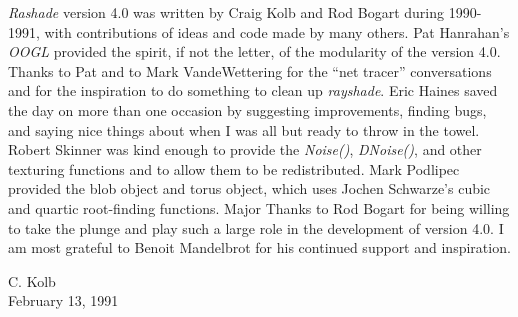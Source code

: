 {\em Rashade} version 4.0
was written by Craig Kolb and Rod Bogart during 1990-1991, with contributions
of ideas and code made by many others.
Pat Hanrahan's {\em OOGL} provided the spirit, if not the letter, of the
modularity of the version 4.0.  Thanks to Pat and to Mark VandeWettering
for the ``net tracer'' conversations and for the inspiration to do something
to clean up {\em rayshade}.
Eric Haines saved the day on more than one occasion by suggesting
improvements, finding bugs, and saying nice things about \rayshade
when I was all but ready to throw in the towel.
Robert Skinner was kind enough to provide the {\em Noise()}, {\em DNoise()},
and other texturing functions and to allow them to be redistributed.
Mark Podlipec provided the blob object and torus object, which uses
Jochen Schwarze's cubic and quartic root-finding functions.
Major Thanks to Rod Bogart for being willing to take the plunge and
play such a large role in the development of version 4.0.
I am most grateful to Benoit Mandelbrot for his
continued support and inspiration.

\begin{flushright}
\parbox[t]{1.5in}{
C. Kolb \\
February 13, 1991
}
\end{flushright}
